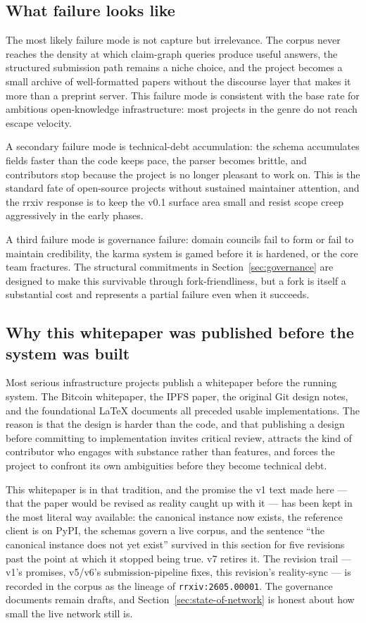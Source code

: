 \documentclass[11pt]{rrxiv}
\begin{document}
\subsection{What failure looks like}

The most likely failure mode is not capture but irrelevance. The corpus never reaches the density at which claim-graph queries produce useful answers, the structured submission path remains a niche choice, and the project becomes a small archive of well-formatted papers without the discourse layer that makes it more than a preprint server. This failure mode is consistent with the base rate for ambitious open-knowledge infrastructure: most projects in the genre do not reach escape velocity.

A secondary failure mode is technical-debt accumulation: the schema accumulates fields faster than the code keeps pace, the parser becomes brittle, and contributors stop because the project is no longer pleasant to work on. This is the standard fate of open-source projects without sustained maintainer attention, and the rrxiv response is to keep the v0.1 surface area small and resist scope creep aggressively in the early phases.

A third failure mode is governance failure: domain councils fail to form or fail to maintain credibility, the karma system is gamed before it is hardened, or the core team fractures. The structural commitments in Section~\ref{sec:governance} are designed to make this survivable through fork-friendliness, but a fork is itself a substantial cost and represents a partial failure even when it succeeds.

\subsection{Why this whitepaper was published before the system was built}

Most serious infrastructure projects publish a whitepaper before the running system. The Bitcoin whitepaper, the IPFS paper, the original Git design notes, and the foundational LaTeX documents all preceded usable implementations. The reason is that the design is harder than the code, and that publishing a design before committing to implementation invites critical review, attracts the kind of contributor who engages with substance rather than features, and forces the project to confront its own ambiguities before they become technical debt.

This whitepaper is in that tradition, and the promise the v1 text made here --- that the paper would be revised as reality caught up with it --- has been kept in the most literal way available: the canonical instance now exists, the reference client is on PyPI, the schemas govern a live corpus, and the sentence ``the canonical instance does not yet exist'' survived in this section for five revisions past the point at which it stopped being true. v7 retires it. The revision trail --- v1's promises, v5/v6's submission-pipeline fixes, this revision's reality-sync --- is recorded in the corpus as the lineage of \texttt{rrxiv:2605.00001}. The governance documents remain drafts, and Section~\ref{sec:state-of-network} is honest about how small the live network still is.
\end{document}
